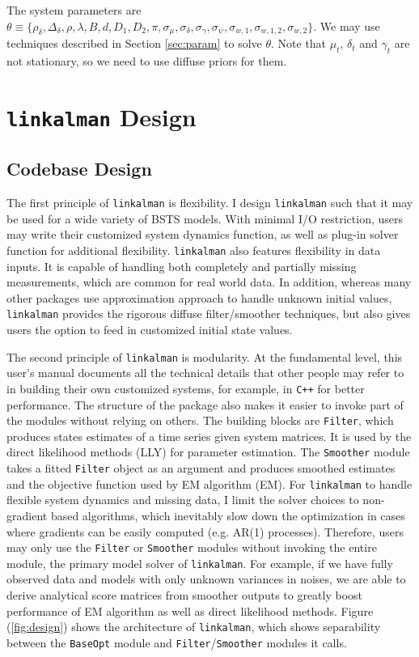 \documentclass[10pt, titlepage]{article}
\numberwithin{equation}{section}
\begin{document}
The system parameters are $\theta\equiv\{\rho_{\delta}, \Delta_{\delta}, \rho, \lambda, B, d, D_1, D_2, \pi, \sigma_{\mu}, \sigma_{\delta}, \sigma_{\gamma}, \sigma_{\psi}, \sigma_{w,1}, \sigma_{w,1,2}, \sigma_{w,2}\}$. We may use techniques described in Section \ref{sec:param} to solve $\theta$. Note that $\mu_t$, $\delta_t$ and $\gamma_{t}$ are not stationary, so we need to use diffuse priors for them. 

\section{\texttt{linkalman} Design} \label{sec:codebase}
\subsection{Codebase Design}
The first principle of \texttt{linkalman} is flexibility. I design \texttt{linkalman} such that it may be used for a wide variety of BSTS models. With minimal I/O restriction, users may write their customized system dynamics function, as well as plug-in solver function for additional flexibility. \texttt{linkalman} also features flexibility in data inputs. It is capable of handling both completely and partially missing measurements, which are common for real world data. In addition, whereas many other packages use approximation approach to handle unknown initial values, \texttt{linkalman} provides the rigorous diffuse filter/smoother techniques, but also gives users the option to feed in customized initial state values. 

The second principle of \texttt{linkalman} is modularity. At the fundamental level, this user's manual documents all the technical details that other people may refer to in building their own customized systems, for example, in \texttt{C++} for better performance. The structure of the package also makes it easier to invoke part of the modules without relying on others. The building blocks are \texttt{Filter}, which produces states estimates of a time series given system matrices. It is used by the direct likelihood methods (LLY) for parameter estimation. The \texttt{Smoother} module takes a fitted \texttt{Filter} object as an argument and produces smoothed estimates and the objective function used by EM algorithm (EM). For \texttt{linkalman} to handle flexible system dynamics and missing data, I limit the solver choices to non-gradient based algorithms, which inevitably slow down the optimization in cases where gradients can be easily computed (e.g. AR(1) processes). Therefore, users may only use the \texttt{Filter} or \texttt{Smoother} modules without invoking the entire  module, the primary model solver of \texttt{linkalman}. For example, if we have fully observed data and models with only unknown variances in noises, we are able to derive analytical score matrices from smoother outputs to greatly boost performance of EM algorithm as well as direct likelihood methods. Figure (\ref{fig:design}) shows the architecture of \texttt{linkalman}, which shows separability between the \texttt{BaseOpt} module and \texttt{Filter}/\texttt{Smoother} modules it calls. 
\end{document}
